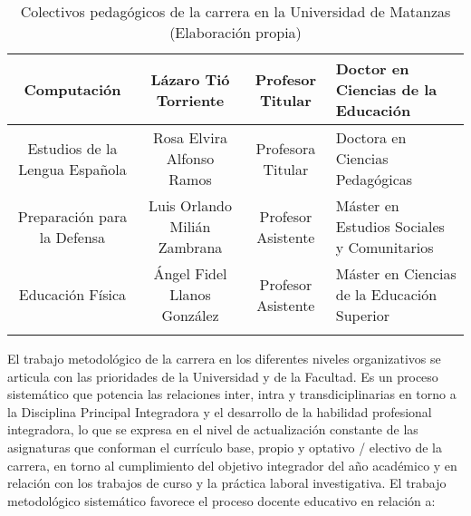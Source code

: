 \begin{longtable}{|c|c|c|p{4.5cm}|}
	\hline
	Computación & \parbox[t]{3cm}{Lázaro Tió Torriente}  & Profesor Titular & Doctor en Ciencias de la Educación \\
	\hline
	\parbox[t]{3cm}{Estudios de la Lengua Española } & \parbox[t]{3cm}{Rosa Elvira Alfonso Ramos} & Profesora Titular & Doctora en Ciencias Pedagógicas  \\
	\hline
	\parbox[t]{3cm}{Preparación para la Defensa} & \parbox[t]{3cm}{Luis Orlando Milián Zambrana} & Profesor Asistente & Máster en Estudios Sociales y Comunitarios \\
	\hline
	Educación Física & \parbox[t]{3cm}{Ángel Fidel Llanos González} & Profesor Asistente & Máster en Ciencias de la Educación Superior \\
	\hline
	\caption{Colectivos pedagógicos de la carrera en la Universidad de Matanzas (Elaboración propia)} 
	\label{tableclaustro}
\end{longtable}


El trabajo metodológico de la carrera en los diferentes niveles organizativos se articula con las prioridades de la Universidad y de la Facultad. Es un proceso sistemático que potencia las relaciones inter, intra y transdiciplinarias en torno a la Disciplina Principal Integradora y el desarrollo de la habilidad profesional integradora, lo que se expresa en el nivel de actualización constante de las asignaturas que conforman el currículo base, propio y optativo / electivo de la carrera, en torno al cumplimiento del objetivo integrador del año académico y en relación con los trabajos de curso y la práctica laboral investigativa. El trabajo metodológico sistemático favorece el proceso docente educativo en relación a:


